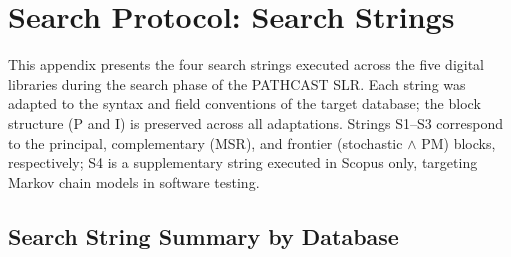 %
%   


\chapter{Search Protocol: Search Strings}
\label{app:E}

This appendix presents the four search strings executed across the five
digital libraries during the search phase of the PATHCAST SLR. Each string
was adapted to the syntax and field conventions of the target database; the
block structure (P and I) is preserved across all adaptations. Strings S1--S3
correspond to the principal, complementary (MSR), and frontier (stochastic
$\wedge$ PM) blocks, respectively; S4 is a supplementary string executed in
Scopus only, targeting Markov chain models in software testing.

\section{Search String Summary by Database}
\label{app:slr-strings}

